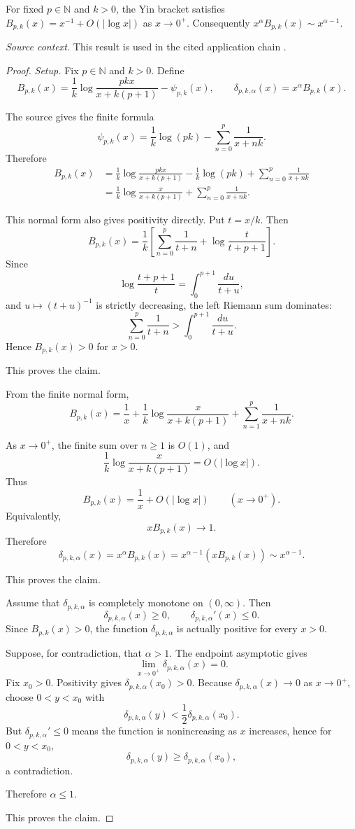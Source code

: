 \begin{proposition}
\label{res:yin-pk-digamma-near-zero-asymptotic}
For fixed \(p\in\mathbb N\) and \(k>0\), the Yin bracket satisfies \(B_{p,k}(x)=x^{-1}+O(|\log x|)\) as \(x\to0^+\). Consequently \(x^\alpha B_{p,k}(x)\sim x^{\alpha-1}\).

\emph{Source context.} This result is used in the cited application chain \cite{app-app-0004-source,yin-pk-digamma}.
\end{proposition}
\begin{proof}
\emph{Setup.}
Fix \(p\in\mathbb N\) and \(k>0\). Define
\[
B_{p,k}(x)=
\frac1k\log\frac{pkx}{x+k(p+1)}-\psi_{p,k}(x),
\qquad
\delta_{p,k,\alpha}(x)=x^\alpha B_{p,k}(x).
\]

The source gives the finite formula
\[
\psi_{p,k}(x)=\frac1k\log(pk)-\sum_{n=0}^p\frac1{x+nk}.
\]
Therefore
\[
\begin{aligned}
B_{p,k}(x)
&=
\frac1k\log\frac{pkx}{x+k(p+1)}
-\frac1k\log(pk)
+\sum_{n=0}^p\frac1{x+nk}  \\
&=
\frac1k\log\frac{x}{x+k(p+1)}
+\sum_{n=0}^p\frac1{x+nk}.
\end{aligned}
\]

This normal form also gives positivity directly. Put \(t=x/k\). Then
\[
B_{p,k}(x)
=\frac1k\left[
\sum_{n=0}^p\frac1{t+n}
+\log\frac{t}{t+p+1}
\right].
\]
Since
\[
\log\frac{t+p+1}{t}=\int_0^{p+1}\frac{du}{t+u},
\]
and \(u\mapsto(t+u)^{-1}\) is strictly decreasing, the left Riemann sum dominates:
\[
\sum_{n=0}^p\frac1{t+n}
>
\int_0^{p+1}\frac{du}{t+u}.
\]
Hence \(B_{p,k}(x)>0\) for \(x>0\).

This proves the claim.

From the finite normal form,
\[
B_{p,k}(x)
=\frac1x
+\frac1k\log\frac{x}{x+k(p+1)}
+\sum_{n=1}^p\frac1{x+nk}.
\]

As \(x\to0^+\), the finite sum over \(n\ge1\) is \(O(1)\), and
\[
\frac1k\log\frac{x}{x+k(p+1)}=O(|\log x|).
\]
Thus
\[
B_{p,k}(x)=\frac1x+O(|\log x|)
\qquad (x\to0^+).
\]
Equivalently,
\[
xB_{p,k}(x)\to1.
\]
Therefore
\[
\delta_{p,k,\alpha}(x)
=x^\alpha B_{p,k}(x)
=x^{\alpha-1}(xB_{p,k}(x))
\sim x^{\alpha-1}.
\]

This proves the claim.

Assume that \(\delta_{p,k,\alpha}\) is completely monotone on \((0,\infty)\). Then
\[
\delta_{p,k,\alpha}(x)\ge0,\qquad
\delta_{p,k,\alpha}'(x)\le0.
\]
Since \(B_{p,k}(x)>0\), the function \(\delta_{p,k,\alpha}\) is actually positive for every \(x>0\).

Suppose, for contradiction, that \(\alpha>1\). The endpoint asymptotic gives
\[
\lim_{x\to0^+}\delta_{p,k,\alpha}(x)=0.
\]
Fix \(x_0>0\). Positivity gives \(\delta_{p,k,\alpha}(x_0)>0\). Because \(\delta_{p,k,\alpha}(x)\to0\) as \(x\to0^+\), choose \(0<y<x_0\) with
\[
\delta_{p,k,\alpha}(y)<\frac12\delta_{p,k,\alpha}(x_0).
\]
But \(\delta_{p,k,\alpha}'\le0\) means the function is nonincreasing as \(x\) increases, hence for \(0<y<x_0\),
\[
\delta_{p,k,\alpha}(y)\ge\delta_{p,k,\alpha}(x_0),
\]
a contradiction.

Therefore \(\alpha\le1\).

This proves the claim.
\end{proof}

